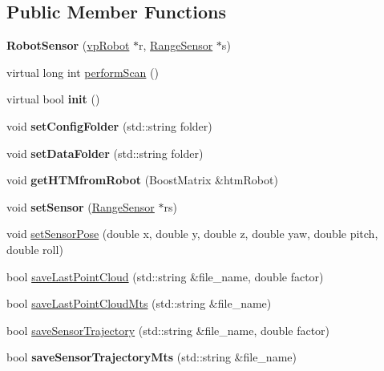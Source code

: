 \subsection*{Public Member Functions}
\begin{DoxyCompactItemize}
\item 
{\bfseries Robot\+Sensor} (\hyperlink{classvpRobot}{vp\+Robot} $\ast$r, \hyperlink{classRangeSensor}{Range\+Sensor} $\ast$s)\hypertarget{classRobotSensor_a47be104f6ee7b01bd71641c4ab263073}{}\label{classRobotSensor_a47be104f6ee7b01bd71641c4ab263073}

\item 
virtual long int \hyperlink{classRobotSensor_a76298deca29d80b6543f628f10060bec}{perform\+Scan} ()
\item 
virtual bool {\bfseries init} ()\hypertarget{classRobotSensor_a45bcf4e2911626b8327f29f9bae5de0e}{}\label{classRobotSensor_a45bcf4e2911626b8327f29f9bae5de0e}

\item 
void {\bfseries set\+Config\+Folder} (std\+::string folder)\hypertarget{classRobotSensor_ab528a4acf62f820cd55e2cf149380889}{}\label{classRobotSensor_ab528a4acf62f820cd55e2cf149380889}

\item 
void {\bfseries set\+Data\+Folder} (std\+::string folder)\hypertarget{classRobotSensor_a44fad2d17f516e7cc0e9933dca33fde6}{}\label{classRobotSensor_a44fad2d17f516e7cc0e9933dca33fde6}

\item 
void {\bfseries get\+H\+T\+Mfrom\+Robot} (Boost\+Matrix \&htm\+Robot)\hypertarget{classRobotSensor_a23c00e9c0038943271cf9131daf2099d}{}\label{classRobotSensor_a23c00e9c0038943271cf9131daf2099d}

\item 
void {\bfseries set\+Sensor} (\hyperlink{classRangeSensor}{Range\+Sensor} $\ast$rs)\hypertarget{classRobotSensor_a16703c2dbce8fb189ebadc54302bfd30}{}\label{classRobotSensor_a16703c2dbce8fb189ebadc54302bfd30}

\item 
void \hyperlink{classRobotSensor_ac2095d4f543f88f36cf704414334a2ba}{set\+Sensor\+Pose} (double x, double y, double z, double yaw, double pitch, double roll)
\item 
bool \hyperlink{classRobotSensor_ac832fdd6f319aa6118cf1b3bcbc08394}{save\+Last\+Point\+Cloud} (std\+::string \&file\+\_\+name, double factor)
\item 
bool \hyperlink{classRobotSensor_a05d2aa70583b6a0a87de4f4ab85a64cd}{save\+Last\+Point\+Cloud\+Mts} (std\+::string \&file\+\_\+name)
\item 
bool \hyperlink{classRobotSensor_a03db6a7ccd4accf68f7ae6b28674196a}{save\+Sensor\+Trajectory} (std\+::string \&file\+\_\+name, double factor)
\item 
bool {\bfseries save\+Sensor\+Trajectory\+Mts} (std\+::string \&file\+\_\+name)\hypertarget{classRobotSensor_a5c5e66676a327bcaf318d761a9204ca9}{}\label{classRobotSensor_a5c5e66676a327bcaf318d761a9204ca9}


\end{DoxyCompactItemize}
